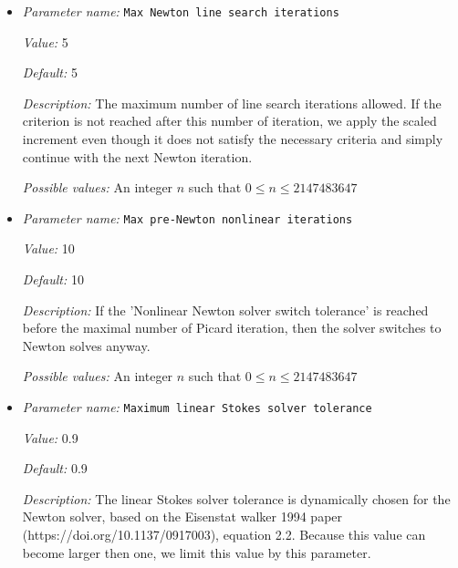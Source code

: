 \begin{itemize}
\item {\it Parameter name:} {\tt Max Newton line search iterations}
\label{parameters:Solver parameters/Newton solver parameters/Max Newton line search iterations}


{\it Value:} 5


{\it Default:} 5


{\it Description:} The maximum number of line search iterations allowed. If the criterion is not reached after this number of iteration, we apply the scaled increment even though it does not satisfy the necessary criteria and simply continue with the next Newton iteration.


{\it Possible values:} An integer $n$ such that $0\leq n \leq 2147483647$
\item {\it Parameter name:} {\tt Max pre-Newton nonlinear iterations}
\label{parameters:Solver parameters/Newton solver parameters/Max pre-Newton nonlinear iterations}


{\it Value:} 10


{\it Default:} 10


{\it Description:} If the 'Nonlinear Newton solver switch tolerance' is reached before the maximal number of Picard iteration, then the solver switches to Newton solves anyway.


{\it Possible values:} An integer $n$ such that $0\leq n \leq 2147483647$
\item {\it Parameter name:} {\tt Maximum linear Stokes solver tolerance}
\label{parameters:Solver parameters/Newton solver parameters/Maximum linear Stokes solver tolerance}


{\it Value:} 0.9


{\it Default:} 0.9


{\it Description:} The linear Stokes solver tolerance is dynamically chosen for the Newton solver, based on the Eisenstat walker 1994 paper (https://doi.org/10.1137/0917003), equation 2.2. Because this value can become larger then one, we limit this value by this parameter.



\end{itemize}
